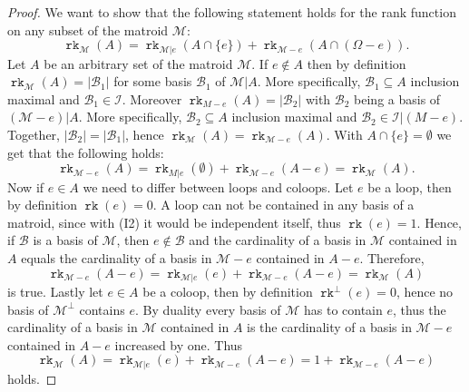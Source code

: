 \documentclass[12pt,a4paper, twoside, autooneside=false]{scrartcl}
\theoremstyle{definition}
\theoremstyle{remark}
\numberwithin{equation}{section}
\DeclareMathOperator{\rk}{\mathtt{rk}}
\newcommand{\M}{\mathcal{M}} %
\begin{document}
\begin{proof}
We want to show that the following statement holds for the rank function on any subset of the matroid $\M$: 
\[
\rk_{\M}(A) = \rk_{\M|e}(A \cap \{e\}) + \rk_{\M - e}(A \cap (\Omega - e)).
\]
Let $A$ be an arbitrary set of the matroid $\M$. If $e \not \in A$ then by definition $\rk_\M(A) = |\mathcal{B}_1|$ for some basis $\mathcal{B}_1$ of $\M|A$. More specifically, $\mathcal{B}_1 \subseteq A$ inclusion maximal and $\mathcal{B}_1 \in \mathcal{I}$. Moreover $\rk_{{M - e}}(A) = |\mathcal{B}_2|$ with $\mathcal{B}_2$ being a basis of $(\M - e)|A$. More specifically, $\mathcal{B}_2 \subseteq A$ inclusion maximal and $\mathcal{B}_2 \in \mathcal{I}|(M - e).$ Together, $|\mathcal{B}_2| = |\mathcal{B}_1|$, hence $\rk_{\M}(A) = \rk_{\M - e}(A)$. With $A \cap \{e \} = \emptyset$ we get that the following holds:
\[
\rk_{\M - e}(A) = \rk_{M|e}(\emptyset) + \rk_{\M-e}(A - e) = \rk_{\M}(A) .
\]
Now if $e \in A$ we need to differ between loops and coloops. Let $e$ be a loop, then by definition $\rk(e) = 0$. A loop can not be contained in any basis of a matroid, since with (I2) it would be independent itself, thus $\rk(e) = 1$. Hence, if $\mathcal{B}$ is a basis of $\M$, then $e \not \in \mathcal{B}$ and the cardinality of a basis in $\M$ contained in $A$ equals the cardinality of a basis in $\M - e$ contained in $A - e$. Therefore,
\[
\rk_{\M - e}(A - e) = \rk_{\M|e}(e) + \rk_{\M - e}(A - e) = \rk_{\M}(A) 
\]
is true. Lastly let $e \in A$ be a coloop, then by definition $\rk^\perp(e) = 0$, hence no basis of $\M^\perp$ contains $e$. By duality every basis of $\M$ has to contain $e$, thus the cardinality of a basis in $\M$ contained in $A$ is the cardinality of a basis in $\M - e$ contained in $A - e$ increased by one. Thus 
\[
\rk_{\M}(A)= \rk_{\M|e}(e) + \rk_{\M - e}(A - e) = 1 + \rk_{\M - e}(A - e)
\]
holds. 
\end{proof}
\end{document}
